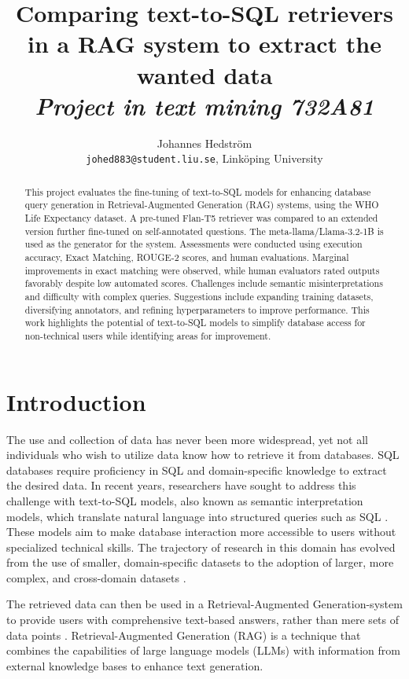 \documentclass[11pt]{article}
\title{Comparing text-to-SQL retrievers in a RAG system to extract the wanted data \\ \large \textit{Project in text mining 732A81}}
\author{ Johannes Hedström\\ \texttt{johed883@student.liu.se}, Linköping University 
  }
\begin{document}
\maketitle

\begin{abstract}
This project evaluates the fine-tuning of text-to-SQL models for enhancing database query generation in Retrieval-Augmented Generation (RAG) systems, using the WHO Life Expectancy dataset. A pre-tuned Flan-T5 retriever was compared to an extended version further fine-tuned on self-annotated questions. The meta-llama/Llama-3.2-1B is used as the generator for the system. Assessments were conducted using execution accuracy, Exact Matching, ROUGE-2 scores, and human evaluations. Marginal improvements in exact matching were observed, while human evaluators rated outputs favorably despite low automated scores. Challenges include semantic misinterpretations and difficulty with complex queries. Suggestions include expanding training datasets, diversifying annotators, and refining hyperparameters to improve performance. This work highlights the potential of text-to-SQL models to simplify database access for non-technical users while identifying areas for improvement.

\end{abstract}

\section{Introduction}

The use and collection of data has never been more widespread, yet not all individuals who wish to utilize data know how to retrieve it from databases. SQL databases require proficiency in SQL and domain-specific knowledge to extract the desired data. In recent years, researchers have sought to address this challenge with text-to-SQL models, also known as semantic interpretation models, which translate natural language into structured queries such as SQL \cite{spider}. These models aim to make database interaction more accessible to users without specialized technical skills\cite{metadata}. The trajectory of research in this domain has evolved from the use of smaller, domain-specific datasets to the adoption of larger, more complex, and cross-domain datasets \cite{spider}.

The retrieved data can then be used in a Retrieval-Augmented Generation-system to provide users with comprehensive text-based answers, rather than mere sets of data points \cite{metadata}. Retrieval-Augmented Generation (RAG) is a technique that combines the capabilities of large language models (LLMs) with information from external knowledge bases to enhance text generation. 
\end{document}
